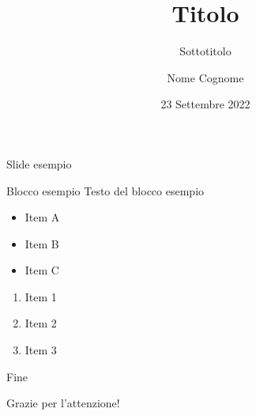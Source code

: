 \documentclass[8pt]{beamer}
\title{Titolo}
\subtitle{Sottotitolo}
\author{Nome Cognome}
\institute{Università di Pisa\\Dipartimento di Matematica}
\date{23 Settembre 2022}
\begin{document}
    {
		\frame{\titlepage}
    }
    
    \begin{frame}{Slide esempio}
        \begin{block}{Blocco esempio}
            Testo del blocco esempio
        \end{block}
        
        \begin{itemize}
            \item Item A
            \item Item B
            \item Item C
        \end{itemize}
        
        \begin{enumerate}
            \item Item 1
            \item Item 2
            \item Item 3
        \end{enumerate} 
    \end{frame}
    
    \begin{frame}{Fine}
        \begin{center}
			{
				\Huge
				Grazie per l'attenzione!
			}
        \end{center}
    \end{frame}
\end{document}
